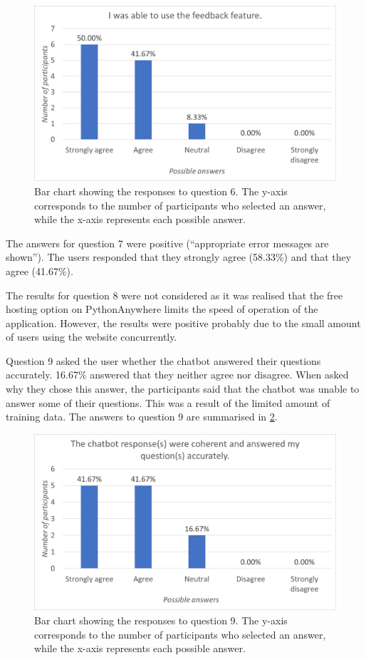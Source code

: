 \documentclass[12pt,a4paper]{article}
\newcommand{\captionstyle}[1] {
    \small{#1}
}
\begin{document}
\begin{figure}[!htb]%
	\centering
	\includegraphics[width=1\columnwidth]{q6}%
	\caption[Bar chart showing the responses to question 6.]{\captionstyle{Bar chart showing the responses to question 6. The y-axis corresponds to the number of participants who selected an answer, while the x-axis represents each possible answer.}}%
	\label{fig:fdbk}%
\end{figure}

The answers for question 7 were positive (“appropriate error messages are shown”). The users responded that they strongly agree (58.33\%) and that they agree (41.67\%).

The results for question 8 were not considered as it was realised that the free hosting option on PythonAnywhere limits the speed of operation of the application. However, the results were positive probably due to the small amount of users using the website concurrently.

Question 9 asked the user whether the chatbot answered their questions accurately. 16.67\% answered that they neither agree nor disagree. When asked why they chose this answer, the participants said that the chatbot was unable to answer some of their questions. This was a result of the limited amount of training data. The answers to question 9 are summarised in \cref{fig:accurate}.

\begin{figure}[!htb]%
	\centering
	\includegraphics[width=1\columnwidth]{q9}%
	\caption[Bar chart showing the responses to question 9.]{\captionstyle{Bar chart showing the responses to question 9. The y-axis corresponds to the number of participants who selected an answer, while the x-axis represents each possible answer.}}%
	\label{fig:accurate}%
\end{figure}
\end{document}
